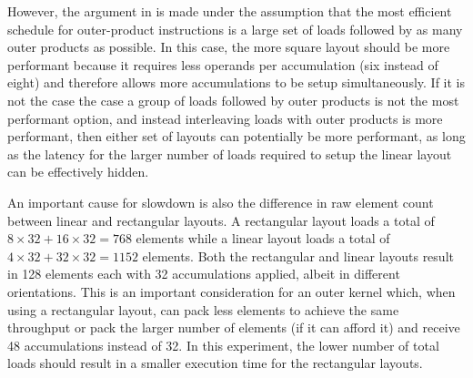 \documentclass[\main/thesis.tex]{subfiles}
\begin{document}
However, the argument in  is made under the assumption that the most efficient schedule for outer-product instructions is a large set of loads followed by as many outer products as possible.
In this case, the more square layout should be more performant because it requires less operands per accumulation (six instead of eight) and therefore allows more accumulations to be setup simultaneously.
If it is not the case the case a group of loads followed by outer products is not the most performant option, and instead interleaving loads with outer products is more performant, then either set of layouts can potentially be more performant, as long as the latency for the larger number of loads required to setup the linear layout can be effectively hidden.

An important cause for slowdown is also the difference in raw element count between linear and rectangular layouts.
A rectangular layout loads a total of $8 \times 32 + 16 \times 32 = 768$ elements while a linear layout loads a total of $4 \times 32 + 32 \times 32 = 1152$ elements.
Both the rectangular and linear layouts result in 128 elements each with 32 accumulations applied, albeit in different orientations.
This is an important consideration for an outer kernel which, when using a rectangular layout, can pack less elements to achieve the same throughput or pack the larger number of elements (if it can afford it) and receive 48 accumulations instead of 32.
In this experiment, the lower number of total loads should result in a smaller execution time for the rectangular layouts.
\end{document}
